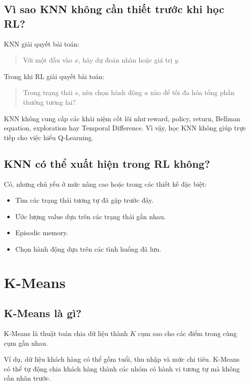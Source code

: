 \documentclass[12pt,a4paper]{report}
\begin{document}
\subsection{Vì sao KNN không cần thiết trước khi học RL?}

KNN giải quyết bài toán:

\begin{quote}
Với một đầu vào \(x\), hãy dự đoán nhãn hoặc giá trị \(y\).
\end{quote}

Trong khi RL giải quyết bài toán:

\begin{quote}
Trong trạng thái \(s\), nên chọn hành động \(a\) nào để tối đa hóa tổng phần thưởng tương lai?
\end{quote}

KNN không cung cấp các khái niệm cốt lõi như reward, policy, return, Bellman equation, exploration hay Temporal Difference. Vì vậy, học KNN không giúp trực tiếp cho việc hiểu Q-Learning.

\subsection{KNN có thể xuất hiện trong RL không?}

Có, nhưng chủ yếu ở mức nâng cao hoặc trong các thiết kế đặc biệt:

\begin{itemize}[leftmargin=1.5em]
    \item Tìm các trạng thái tương tự đã gặp trước đây.
    \item Ước lượng value dựa trên các trạng thái gần nhau.
    \item Episodic memory.
    \item Chọn hành động dựa trên các tình huống đã lưu.
\end{itemize}

\section{K-Means}

\subsection{K-Means là gì?}

K-Means là thuật toán chia dữ liệu thành \(K\) cụm sao cho các điểm trong cùng cụm gần nhau.

Ví dụ, dữ liệu khách hàng có thể gồm tuổi, thu nhập và mức chi tiêu. K-Means có thể tự động chia khách hàng thành các nhóm có hành vi tương tự mà không cần nhãn trước.
\end{document}
